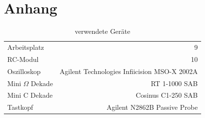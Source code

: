 \documentclass[10pt,a4paper]{scrartcl}
\begin{document}
\section {Anhang}

\begin{table}[ht!]
    \centering
    \caption{verwendete Geräte} \label{tab:devices}
    \begin{tabular}{lr}
        Arbeitsplatz & 9\\
        RC-Modul&10\\
        Oszilloskop&Agilent Technologies Infiicision MSO-X 2002A\\
        Mini $\Omega$ Dekade&RT 1-1000 SAB\\
        Mini C Dekade&Cosinus C1-250 SAB\\
        Tastkopf&Agilent N2862B Passive Probe
    \end{tabular}
\end{table}
\end{document}
